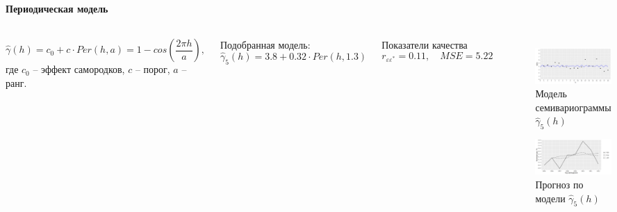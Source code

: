 \documentclass[notheorems]{beamer}
\theoremstyle{definition}
\theoremstyle{example}
\theoremstyle{plain}
\begin{document}
\begin{frame}
  \frametitle{\large\subsecname}
  \framesubtitle{Периодическая модель}
  \begin{columns}[c]
  {\footnotesize
  \begin{equation*}
    \widehat{\gamma}(h) = c_0 + c \cdot Per(h, a) = 1 - cos(\frac{2 \pi h}{a}),
  \end{equation*}
  где $ c_0 $ -- эффект самородков, $ c $ -- порог, $ a $ -- ранг.

  \vspace{0.5em}

  Подобранная модель:
  \begin{equation}
  \label{eq:gamma10}
    \widehat{\gamma}_5(h) = 3.8 + 0.32 \cdot Per(h, 1.3)
  \end{equation}

  Показатели качества
  \begin{equation*}
    r_{\varepsilon\varepsilon^{*}} = 0.11, \quad MSE = 5.22
  \end{equation*}
  }

  \vspace{-14.5pt}
  \begin{figure}[H]
    \includegraphics[width=0.9\linewidth]{../../figures/variogram/auto-class-18-modeled.png} \\
    \caption{Модель семивариограммы $\widehat{\gamma}_5(h)$}
    \includegraphics[width=0.9\linewidth]{../../figures/variogram/auto-class-18-cross-prediction.png}
    \caption{Прогноз по модели $\widehat{\gamma}_5(h)$}
  \end{figure}
  \end{columns}
\end{frame}
\end{document}

